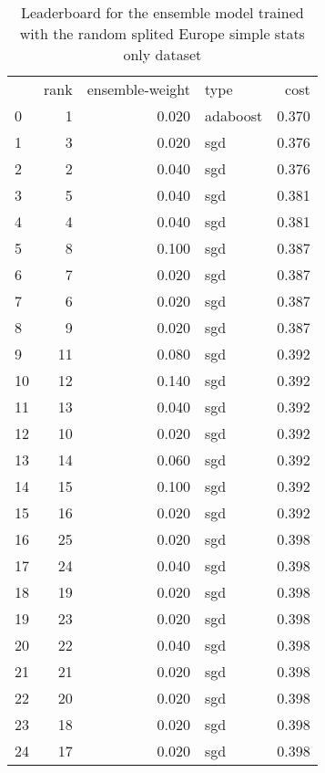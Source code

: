 \begin{table}[]
	\centering
	\begin{tabular}{lrrlr}
		   & rank & ensemble-weight & type     & cost  \\
		0  & 1    & 0.020           & adaboost & 0.370 \\
		1  & 3    & 0.020           & sgd      & 0.376 \\
		2  & 2    & 0.040           & sgd      & 0.376 \\
		3  & 5    & 0.040           & sgd      & 0.381 \\
		4  & 4    & 0.040           & sgd      & 0.381 \\
		5  & 8    & 0.100           & sgd      & 0.387 \\
		6  & 7    & 0.020           & sgd      & 0.387 \\
		7  & 6    & 0.020           & sgd      & 0.387 \\
		8  & 9    & 0.020           & sgd      & 0.387 \\
		9  & 11   & 0.080           & sgd      & 0.392 \\
		10 & 12   & 0.140           & sgd      & 0.392 \\
		11 & 13   & 0.040           & sgd      & 0.392 \\
		12 & 10   & 0.020           & sgd      & 0.392 \\
		13 & 14   & 0.060           & sgd      & 0.392 \\
		14 & 15   & 0.100           & sgd      & 0.392 \\
		15 & 16   & 0.020           & sgd      & 0.392 \\
		16 & 25   & 0.020           & sgd      & 0.398 \\
		17 & 24   & 0.040           & sgd      & 0.398 \\
		18 & 19   & 0.020           & sgd      & 0.398 \\
		19 & 23   & 0.020           & sgd      & 0.398 \\
		20 & 22   & 0.040           & sgd      & 0.398 \\
		21 & 21   & 0.020           & sgd      & 0.398 \\
		22 & 20   & 0.020           & sgd      & 0.398 \\
		23 & 18   & 0.020           & sgd      & 0.398 \\
		24 & 17   & 0.020           & sgd      & 0.398 \\
	\end{tabular}

	\caption{Leaderboard for the ensemble model trained with the random splited Europe simple stats only dataset}
	\label{tab:lb-europe-games-stats-only-randsplit}
\end{table}

